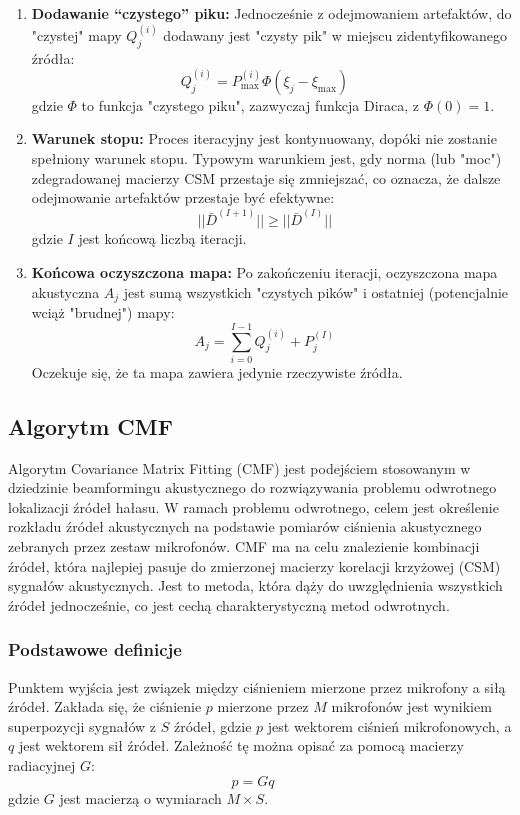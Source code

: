 \documentclass[12pt]{article}
\begin{document}
\begin{enumerate}
    \item \textbf{Dodawanie ``czystego'' piku:} Jednocześnie z odejmowaniem artefaktów, do "czystej" mapy $Q^{(i)}_j$ dodawany jest "czysty pik" w miejscu zidentyfikowanego źródła:
    \begin{equation}
    Q^{(i)}_j = P^{(i)}_{\text{max}} \Phi(\xi_j - \xi_{\text{max}}) \quad \text{}
    \end{equation}
    gdzie $\Phi$ to funkcja "czystego piku", zazwyczaj funkcja Diraca, z $\Phi(0)=1$.

    \item \textbf{Warunek stopu:} Proces iteracyjny jest kontynuowany, dopóki nie zostanie spełniony warunek stopu. Typowym warunkiem jest, gdy norma (lub "moc") zdegradowanej macierzy CSM przestaje się zmniejszać, co oznacza, że dalsze odejmowanie artefaktów przestaje być efektywne:
    \begin{equation}
    ||\bar{D}^{(I+1)}|| \ge ||\bar{D}^{(I)}|| \quad \text{}
    \end{equation}
    gdzie $I$ jest końcową liczbą iteracji.

    \item \textbf{Końcowa oczyszczona mapa:} Po zakończeniu iteracji, oczyszczona mapa akustyczna $A_j$ jest sumą wszystkich "czystych pików" i ostatniej (potencjalnie wciąż "brudnej") mapy:
    \begin{equation}
    A_j = \sum_{i=0}^{I-1} Q^{(i)}_j + P^{(I)}_j \quad \text{}
    \end{equation}
    Oczekuje się, że ta mapa zawiera jedynie rzeczywiste źródła.
\end{enumerate}

\subsection{Algorytm CMF}
Algorytm Covariance Matrix Fitting (CMF) jest podejściem stosowanym w dziedzinie beamformingu akustycznego do rozwiązywania problemu odwrotnego lokalizacji źródeł hałasu. W ramach problemu odwrotnego, celem jest określenie rozkładu źródeł akustycznych na podstawie pomiarów ciśnienia akustycznego zebranych przez zestaw mikrofonów. CMF ma na celu znalezienie kombinacji źródeł, która najlepiej pasuje do zmierzonej macierzy korelacji krzyżowej (CSM) sygnałów akustycznych. Jest to metoda, która dąży do uwzględnienia wszystkich źródeł jednocześnie, co jest cechą charakterystyczną metod odwrotnych.

\subsubsection{Podstawowe definicje}
Punktem wyjścia jest związek między ciśnieniem mierzone przez mikrofony a siłą źródeł. Zakłada się, że ciśnienie $p$ mierzone przez $M$ mikrofonów jest wynikiem superpozycji sygnałów z $S$ źródeł, gdzie $p$ jest wektorem ciśnień mikrofonowych, a $q$ jest wektorem sił źródeł. Zależność tę można opisać za pomocą macierzy radiacyjnej $G$:
\begin{equation}
p = Gq \quad \text{}
\end{equation}
gdzie $G$ jest macierzą o wymiarach $M \times S$.
\end{document}
